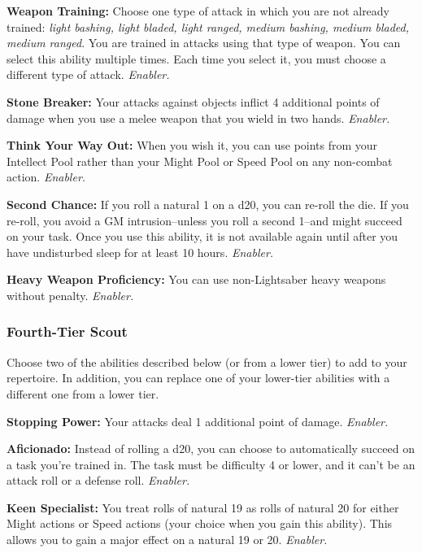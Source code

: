 \documentclass[a4paper,10pt,final,twocolumn,oneside]{book}
\newcommand{\itemAbility}[2]{\textcolor{25gray}{\textbullet\textbf{ #1:}}{ #2}\par}
\newcommand{\enabler}{\textit{ Enabler.}}
\begin{document}
\itemAbility{Weapon Training}{Choose one type of attack in which you are not already trained: \textit{light bashing, light bladed, light ranged, medium bashing, medium bladed, medium ranged}. You are trained in attacks using that type of weapon. You can select this ability multiple times. Each time you select it, you must choose a different type of attack.\enabler}

\itemAbility{Stone Breaker}{Your attacks against objects inflict 4 additional points of damage when you use a melee weapon that you wield in two hands.\enabler}

\itemAbility{Think Your Way Out}{When you wish it, you can use points from your Intellect Pool rather than your Might Pool or Speed Pool on any non-combat action.\enabler}

\itemAbility{Second Chance}{If you roll a natural 1 on a d20, you can re-roll the die. If you re-roll, you avoid a GM intrusion--unless you roll a second 1--and might succeed on your task. Once you use this ability, it is not available again until after you have undisturbed sleep for at least 10 hours.\enabler}

\itemAbility{Heavy Weapon Proficiency}{You can use non-Lightsaber heavy weapons without penalty.\enabler}


\subsubsection*{Fourth-Tier Scout}
\label{subsub:scoutFourthTier}

Choose two of the abilities described
below (or from a lower tier) to add to your
repertoire. In addition, you can replace one
of your lower-tier abilities with a different
one from a lower tier.

\itemAbility{Stopping Power}{Your attacks deal 1 additional point of damage.\enabler}

\itemAbility{Aficionado}{Instead of rolling a d20, you can choose to automatically succeed on a task you’re trained in. The task must be difficulty 4 or lower, and it can’t be an attack roll or a defense roll.\enabler}

\itemAbility{Keen Specialist}{You treat rolls of natural 19 as rolls of natural 20 for either Might actions or Speed actions (your choice when you gain this ability). This allows you to gain a major effect on a natural 19 or 20.\enabler}
\end{document}
